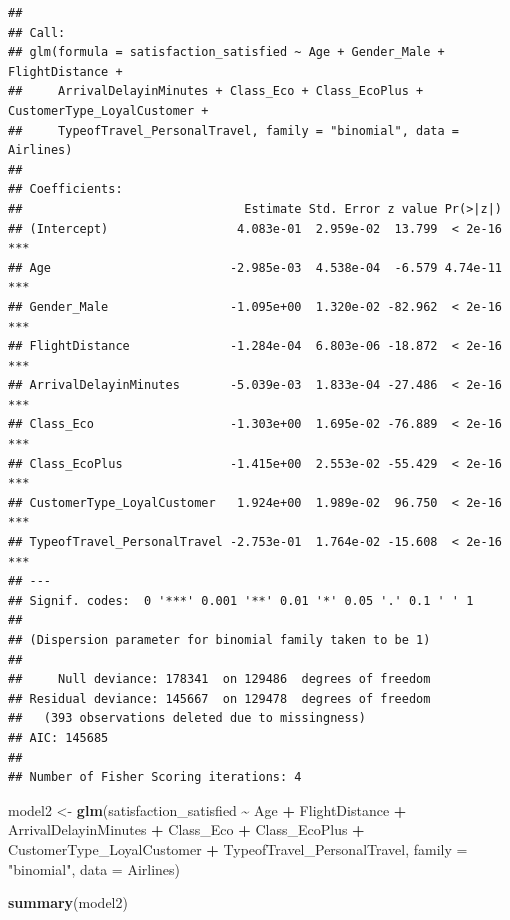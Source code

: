 \documentclass[
]{article}
\newenvironment{Shaded}{\begin{snugshade}}{\end{snugshade}}
\newcommand{\AttributeTok}[1]{\textcolor[rgb]{0.13,0.29,0.53}{#1}}
\newcommand{\FunctionTok}[1]{\textcolor[rgb]{0.13,0.29,0.53}{\textbf{#1}}}
\newcommand{\NormalTok}[1]{#1}
\newcommand{\OtherTok}[1]{\textcolor[rgb]{0.56,0.35,0.01}{#1}}
\newcommand{\SpecialCharTok}[1]{\textcolor[rgb]{0.81,0.36,0.00}{\textbf{#1}}}
\newcommand{\StringTok}[1]{\textcolor[rgb]{0.31,0.60,0.02}{#1}}
\begin{document}
\begin{verbatim}
## 
## Call:
## glm(formula = satisfaction_satisfied ~ Age + Gender_Male + FlightDistance + 
##     ArrivalDelayinMinutes + Class_Eco + Class_EcoPlus + CustomerType_LoyalCustomer + 
##     TypeofTravel_PersonalTravel, family = "binomial", data = Airlines)
## 
## Coefficients:
##                               Estimate Std. Error z value Pr(>|z|)    
## (Intercept)                  4.083e-01  2.959e-02  13.799  < 2e-16 ***
## Age                         -2.985e-03  4.538e-04  -6.579 4.74e-11 ***
## Gender_Male                 -1.095e+00  1.320e-02 -82.962  < 2e-16 ***
## FlightDistance              -1.284e-04  6.803e-06 -18.872  < 2e-16 ***
## ArrivalDelayinMinutes       -5.039e-03  1.833e-04 -27.486  < 2e-16 ***
## Class_Eco                   -1.303e+00  1.695e-02 -76.889  < 2e-16 ***
## Class_EcoPlus               -1.415e+00  2.553e-02 -55.429  < 2e-16 ***
## CustomerType_LoyalCustomer   1.924e+00  1.989e-02  96.750  < 2e-16 ***
## TypeofTravel_PersonalTravel -2.753e-01  1.764e-02 -15.608  < 2e-16 ***
## ---
## Signif. codes:  0 '***' 0.001 '**' 0.01 '*' 0.05 '.' 0.1 ' ' 1
## 
## (Dispersion parameter for binomial family taken to be 1)
## 
##     Null deviance: 178341  on 129486  degrees of freedom
## Residual deviance: 145667  on 129478  degrees of freedom
##   (393 observations deleted due to missingness)
## AIC: 145685
## 
## Number of Fisher Scoring iterations: 4
\end{verbatim}

\begin{Shaded}
\begin{Highlighting}[]
\NormalTok{model2 }\OtherTok{\textless{}{-}} \FunctionTok{glm}\NormalTok{(satisfaction\_satisfied }\SpecialCharTok{\textasciitilde{}}\NormalTok{ Age }\SpecialCharTok{+}\NormalTok{ FlightDistance }\SpecialCharTok{+}\NormalTok{ ArrivalDelayinMinutes }\SpecialCharTok{+}\NormalTok{ Class\_Eco }\SpecialCharTok{+}\NormalTok{ Class\_EcoPlus }\SpecialCharTok{+}\NormalTok{ CustomerType\_LoyalCustomer }\SpecialCharTok{+}\NormalTok{ TypeofTravel\_PersonalTravel, }\AttributeTok{family =} \StringTok{"binomial"}\NormalTok{, }\AttributeTok{data =}\NormalTok{ Airlines)}

\FunctionTok{summary}\NormalTok{(model2)}
\end{Highlighting}
\end{Shaded}
\end{document}

